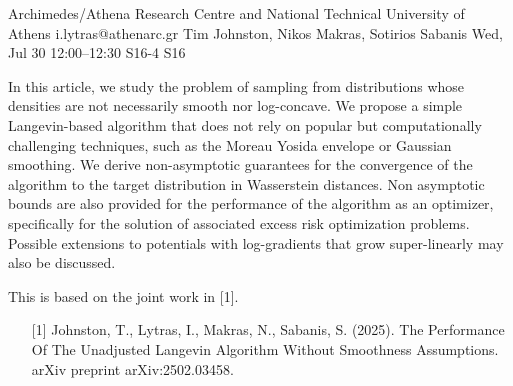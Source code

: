 \begin{talk}
  {Archimedes/Athena Research Centre and National Technical University of Athens}%
  {i.lytras@athenarc.gr}%
  {Tim Johnston, Nikos Makras, Sotirios Sabanis}%
  {}%
  {}%
  {}%
  {Wed, Jul 30 12:00–12:30}%
  {S16-4}%
  {S16}%
  
				
			
In this article, we study the problem of sampling from distributions whose densities are not necessarily smooth nor log-concave. We propose a simple Langevin-based algorithm that does not rely on popular but computationally challenging techniques, such as the Moreau Yosida envelope or Gaussian smoothing. We derive non-asymptotic guarantees for the convergence of the algorithm to the target distribution in Wasserstein distances. Non asymptotic bounds are also provided for the performance of the algorithm as an optimizer, specifically for the solution of associated excess risk optimization problems.\\
Possible extensions to potentials with log-gradients that grow super-linearly may also be discussed.

This is based on the joint work in [1].
\medskip

\begin{enumerate}
    \item [{[1]}] Johnston, T., Lytras, I., Makras, N., Sabanis, S. (2025). The Performance Of The Unadjusted Langevin Algorithm Without Smoothness Assumptions. arXiv preprint arXiv:2502.03458.
\end{enumerate}
\end{talk}


